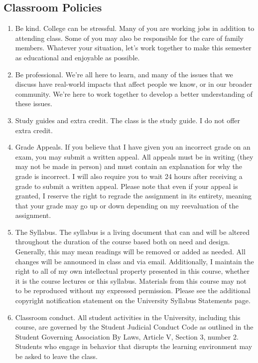 \documentclass[
  letterpaper,
  DIV=11,
  numbers=noendperiod]{scrartcl}
\begin{document}
\subsection{Classroom Policies}\label{classroom-policies}

\begin{enumerate}
\def\labelenumi{\arabic{enumi}.}
\item
  Be kind. College can be stressful. Many of you are working jobs in
  addition to attending class. Some of you may also be responsible for
  the care of family members. Whatever your situation, let's work
  together to make this semester as educational and enjoyable as
  possible.
\item
  Be professional. We're all here to learn, and many of the issues that
  we discuss have real-world impacts that affect people we know, or in
  our broader community. We're here to work together to develop a better
  understanding of these issues.
\item
  Study guides and extra credit. The class is the study guide. I do not
  offer extra credit.
\item
  Grade Appeals. If you believe that I have given you an incorrect grade
  on an exam, you may submit a written appeal. All appeals must be in
  writing (they may not be made in person) and must contain an
  explanation for why the grade is incorrect. I will also require you to
  wait 24 hours after receiving a grade to submit a written appeal.
  Please note that even if your appeal is granted, I reserve the right
  to regrade the assignment in its entirety, meaning that your grade may
  go up or down depending on my reevaluation of the assignment.
\item
  The Syllabus. The syllabus is a living document that can and will be
  altered throughout the duration of the course based both on need and
  design. Generally, this may mean readings will be removed or added as
  needed. All changes will be announced in class and via email.
  Additionally, I maintain the right to all of my own intellectual
  property presented in this course, whether it is the course lectures
  or this syllabus. Materials from this course may not to be reproduced
  without my expressed permission. Please see the additional copyright
  notification statement on the University Syllabus Statements page.
\item
  Classroom conduct. All student activities in the University, including
  this course, are governed by the Student Judicial Conduct Code as
  outlined in the Student Governing Association By Laws, Article V,
  Section 3, number 2. Students who engage in behavior that disrupts the
  learning environment may be asked to leave the class.
\end{enumerate}
\end{document}
